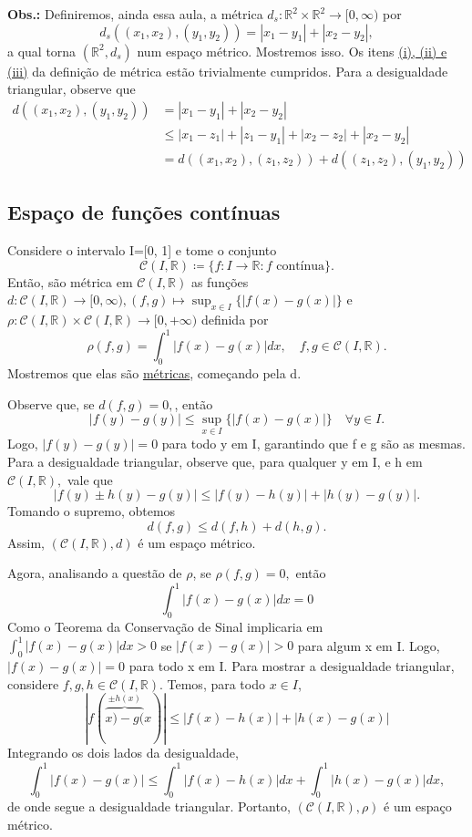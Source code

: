 \documentclass[metric_notes.tex]{subfiles}
\begin{document}
\textbf{Obs.:} Definiremos, ainda essa aula, a métrica \(d_{s}:\mathbb{R}^{2}\times \mathbb{R}^{2}\rightarrow [0, \infty)\) por
\[
	d_{s}((x_{1}, x_{2}), (y_{1}, y_{2})) = |x_{1}-y_{1}|+|x_{2}-y_{2}|,
\]
a qual torna \((\mathbb{R}^{2}, d_{s})\) num espaço métrico. Mostremos isso. Os itens \hyperlink{def_metric}{(i), (ii) e (iii)}
da definição de métrica estão trivialmente cumpridos. Para a desigualdade triangular, observe que
\begin{align*}
	d((x_{1}, x_{2}), (y_{1}, y_{2})) & = |x_{1}-y_{1}| + |x_{2}-y_{2}|                                        \\
	                                  & \leq |x_{1}-z_{1}| + |z_{1}-y_{1}| + |x_{2}-z_{2}| + |x_{2}-y_{2}|     \\
	                                  & =d((x_{1}, x_{2}), (z_{1}, z_{2})) + d((z_{1}, z_{2}), (y_{1}, y_{2}))
\end{align*}
\subsection{Espaço de funções contínuas}
Considere o intervalo I=[0, 1] e tome o conjunto
\[
	\mathcal{C}(I, \mathbb{R})\coloneqq \{f:I\rightarrow \mathbb{R}: f \text{ contínua}\}.
\]
Então, são métrica em \(\mathcal{C}(I, \mathbb{R})\) as funções \(d:\mathcal{C}(I, \mathbb{R})\rightarrow [0, \infty), (f, g)\mapsto \sup_{x\in I}\{|f(x)-g(x)|\}\)
e \(\rho :\mathcal{C}(I, \mathbb{R})\times \mathcal{C}(I, \mathbb{R})\rightarrow [0, +\infty)\) definida por
\[
	\rho(f, g) = \int_{0}^{1}|f(x)-g(x)|dx,\quad f, g\in \mathcal{C}(I, \mathbb{R}).
\]
Mostremos que elas são \hyperlink{def_metric}{métricas}, começando pela d.

Observe que, se \(d(f, g) = 0,\), então
\[
	|f(y)-g(y)|\leq \sup_{x\in I}\{|f(x)-g(x)|\}\quad \forall y\in I.
\]
Logo, \(|f(y) - g(y)| = 0\) para todo y em I, garantindo que f e g são as mesmas.
Para a desigualdade triangular, observe que, para qualquer y em I, e h em \(\mathcal{C}(I, \mathbb{R}),\) vale que
\[
	|f(y)\pm h(y) - g(y)|\leq |f(y) - h(y)| + |h(y) - g(y)|.
\]
Tomando o supremo, obtemos
\[
	d(f, g)\leq d(f, h) + d(h, g).
\]
Assim, \((\mathcal{C}(I, \mathbb{R}), d)\) é um espaço métrico.

Agora, analisando a questão de \(\rho\), se \(\rho (f, g) = 0,\) então
\[
	\int_{0}^{1}|f(x)-g(x)|dx = 0
\]
Como o Teorema da Conservação de Sinal implicaria em \(\int_{0}^{1}|f(x)-g(x)|dx > 0\) se \(|f(x)-g(x)| > 0\) para algum x em I.
Logo, \(|f(x)-g(x)|=0\) para todo x em I. Para mostrar a desigualdade triangular, considere \(f, g, h\in \mathcal{C}(I, \mathbb{R}).\)
Temos, para todo \(x\in I\),
\[
	|f(\overbrace{x)-g(}^{\pm h(x)}x)|\leq |f(x) - h(x)| + |h(x) - g(x)|
\]
Integrando os dois lados da desigualdade,
\[
	\int_{0}^{1}|f(x)-g(x)|\leq \int_{0}^{1}|f(x) - h(x)|dx + \int_{0}^{1}|h(x) - g(x)|dx,
\]
de onde segue a desigualdade triangular. Portanto, \((\mathcal{C}(I, \mathbb{R}), \rho)\) é um espaço métrico.
\end{document}
